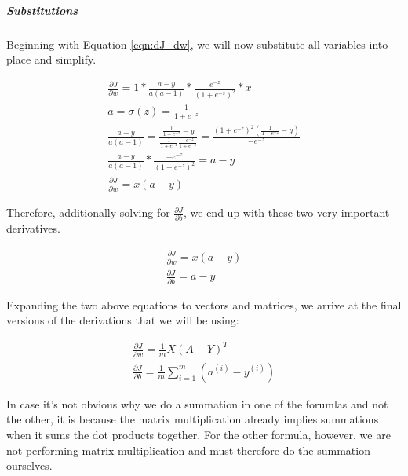 \documentclass{article}
\newcommand{\mysubparagraph}[1]{\subparagraph{#1}\mbox{}}
\begin{document}
\mysubparagraph{Substitutions}

Beginning with Equation \ref{eqn:dJ_dw}, we will now substitute all variables into place and simplify.

\begin{gather}
\frac{\partial{J}}{\partial{w}} = 1 * \frac{a-y}{a(a-1)} * \frac{e^{-z}}{(1+e^{-z})^{2}} * x \\
%
a = \sigma(z) = \frac{1}{1 + e^{-z}} \\
%
\frac{a-y}{a(a-1)} = \frac{\frac{1}{1 + e^{-z}} - y}{\frac{1}{1 + e^{-z}} \frac{-e^{-z}}{1 + e^{-z}}} = \frac{(1+e^{-z})^2 (\frac{1}{1 + e^{-z}} - y)}{-e^{-z}} \\
%
\frac{a-y}{a(a-1)} * \frac{-e^{-z}}{(1+e^{-z})^{2}} = a-y \\
%
\frac{\partial{J}}{\partial{w}} = x(a-y)
\end{gather}

Therefore, additionally solving for $\frac{\partial{J}}{\partial{b}}$, we end up with these two very important derivatives.

\begin{gather}
\frac{\partial{J}}{\partial{w}} = x(a-y) \\
%
\frac{\partial{J}}{\partial{b}} = a-y
\end{gather}

Expanding the two above equations to vectors and matrices, we arrive at the final versions of the derivations that we will be using:

\begin{gather}
\frac{\partial{J}}{\partial{w}} = \frac{1}{m} X(A-Y)^{T} \\
%
\frac{\partial{J}}{\partial{b}} = \frac{1}{m} \sum_{i=1}^{m} (a^{(i)} - y^{(i)})
\end{gather}

In case it's not obvious why we do a summation in one of the forumlas and not the other, it is because the matrix multiplication already implies summations when it sums the dot products together.  For the other formula, however, we are not performing matrix multiplication and must therefore do the summation ourselves.
\end{document}
